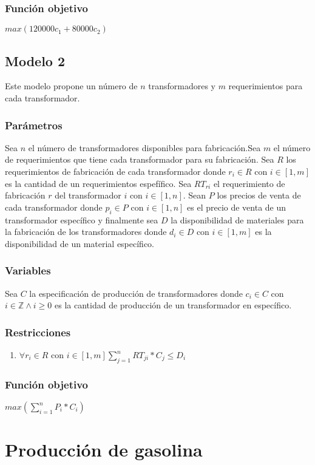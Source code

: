 \documentclass{article}
\begin{document}
\subsubsection{Función objetivo}
$max(120000c_1 + 80000c_2)$


\subsection{Modelo 2}
Este modelo propone un número de $n$ transformadores y $m$ requerimientos para cada transformador.
\subsubsection{Parámetros}
Sea $n$ el número de transformadores disponibles para fabricación.Sea $m$ el número de requerimientos que tiene cada transformador para su fabricación. Sea $R$ los requerimientos de fabricación de cada transformador donde $r_i \in R$ con $i \in [1,m]$ es la cantidad de un requerimientos espefífico. Sea $RT_{ri}$ el requerimiento de fabricación $r$ del transformador $i$ con $i \in [1,n]$. Sean $P$ los precios de venta de cada transformador donde $p_i \in P$ con $i \in [1,n]$ es el precio de venta de un transformador específico y finalmente sea $D$ la disponibilidad de materiales para la fabricación de los transformadores donde $d_i \in D$ con $i \in [1,m]$ es la disponibilidad de un material específico.
\subsubsection{Variables}
Sea $C$ la especificación de producción de transformadores donde $c_i \in C$ con $i \in \mathbb{Z} \land i \geq  0$ es la cantidad de producción de un transformador en específico.
\subsubsection{Restricciones}
\begin{enumerate}
    \item $\forall r_{i} \in R$ con $i \in [1,m] \sum_{j=1}^n RT_{ji}*C_j \leq D_{i} $
\end{enumerate}
\subsubsection{Función objetivo}
$max(\sum_{i=1}^{n} P_i*C_i)$


\section{Producción de gasolina}
\end{document}
